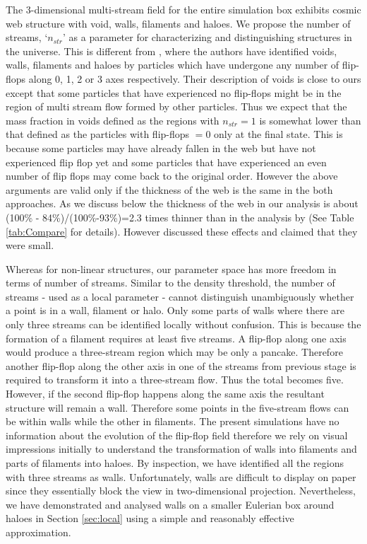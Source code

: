 The 3-dimensional multi-stream field for the entire simulation box exhibits cosmic web structure with void, walls, filaments and haloes. We propose the number of streams, `$n_{str}$' as a parameter for characterizing and distinguishing structures in the universe. This is different from \citet{Falck2015}, 
where the authors have identified voids, walls, filaments and haloes by particles which have undergone any number of flip-flops along 0, 1, 2 or 3 axes respectively. 
Their description of voids is close to ours except that some particles that have  experienced no flip-flops might be in the region
of multi stream flow formed by other particles.
Thus we expect that the mass fraction in voids defined as the regions with $n_{str} = 1$ is somewhat lower than that defined as the particles with 
flip-flops $= 0$ only at the final state. This is because some particles may have already fallen in the web but  have not experienced flip flop yet and 
some particles that have experienced an even number of flip flops may come back to the original order. However the above arguments are valid only if the thickness of the web is the same in the both approaches. As we discuss below the thickness of the web in our analysis is about (100\% - 84\%)/(100\%-93\%)=2.3 times thinner than in  the analysis by \citet{Falck2015} (See Table \ref{tab:Compare} for details). However  \citet{Falck2015} discussed these effects and claimed that they were small.

Whereas for non-linear structures, our parameter space has more freedom in terms of number of streams. 
Similar to the density threshold, the number of streams - used as a local parameter - cannot distinguish unambiguously whether a point is in a wall, 
filament or halo. Only some parts of walls where there are only three streams can be identified locally without confusion. This is because the formation of a filament
requires at least five streams. A flip-flop along one axis  would produce a three-stream region which may be only a pancake. 
 Therefore  another flip-flop along the other axis in one of the streams
from previous stage is required to transform it into a three-stream flow. Thus the total becomes five. However, if the second flip-flop happens along the same axis 
the resultant structure will remain a wall. Therefore some points in the five-stream flows can be within walls while the other in filaments. The present simulations have no information about the evolution of the flip-flop field
therefore we rely on visual impressions initially to understand the transformation of walls into filaments and parts of filaments into  haloes. By inspection, we have identified all the regions with three streams as walls. Unfortunately, walls are difficult to display on paper since they essentially block the view in two-dimensional projection. Nevertheless, we have demonstrated and analysed walls on a smaller Eulerian box around haloes in Section \ref{sec:local} using a simple and reasonably effective approximation. 


